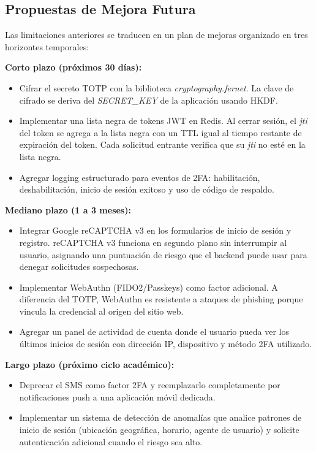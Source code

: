\documentclass[12pt,letterpaper]{article}
\begin{document}
\subsection{Propuestas de Mejora Futura}

Las limitaciones anteriores se traducen en un plan de mejoras organizado en tres horizontes temporales:

\textbf{Corto plazo (pr\'oximos 30 d\'ias):}
\begin{itemize}
    \item Cifrar el secreto TOTP con la biblioteca \textit{cryptography.fernet}. La clave de cifrado se deriva del \textit{SECRET\_KEY} de la aplicaci\'on usando HKDF.
    \item Implementar una lista negra de tokens JWT en Redis. Al cerrar sesi\'on, el \textit{jti} del token se agrega a la lista negra con un TTL igual al tiempo restante de expiraci\'on del token. Cada solicitud entrante verifica que su \textit{jti} no est\'e en la lista negra.
    \item Agregar logging estructurado para eventos de 2FA: habilitaci\'on, deshabilitaci\'on, inicio de sesi\'on exitoso y uso de c\'odigo de respaldo.
\end{itemize}

\textbf{Mediano plazo (1 a 3 meses):}
\begin{itemize}
    \item Integrar Google reCAPTCHA v3 en los formularios de inicio de sesi\'on y registro. reCAPTCHA v3 funciona en segundo plano sin interrumpir al usuario, asignando una puntuaci\'on de riesgo que el backend puede usar para denegar solicitudes sospechosas.
    \item Implementar WebAuthn (FIDO2/Passkeys) como factor adicional. A diferencia del TOTP, WebAuthn es resistente a ataques de phishing porque vincula la credencial al origen del sitio web.
    \item Agregar un panel de actividad de cuenta donde el usuario pueda ver los \'ultimos inicios de sesi\'on con direcci\'on IP, dispositivo y m\'etodo 2FA utilizado.
\end{itemize}

\textbf{Largo plazo (pr\'oximo ciclo acad\'emico):}
\begin{itemize}
    \item Deprecar el SMS como factor 2FA y reemplazarlo completamente por notificaciones push a una aplicaci\'on m\'ovil dedicada.
    \item Implementar un sistema de detecci\'on de anomal\'ias que analice patrones de inicio de sesi\'on (ubicaci\'on geogr\'afica, horario, agente de usuario) y solicite autenticaci\'on adicional cuando el riesgo sea alto.
\end{itemize}
\end{document}
